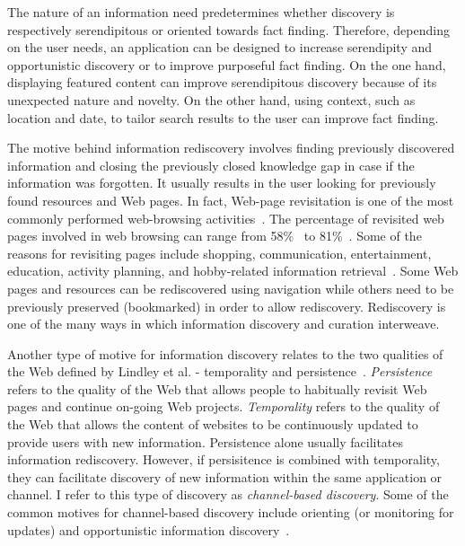 {{The nature of an information need predetermines whether discovery is respectively serendipitous or oriented towards fact finding. Therefore, depending on the user needs, an application can be designed to increase serendipity and opportunistic discovery or to improve purposeful fact finding. On the one hand, displaying featured content can improve serendipitous discovery because of its unexpected nature and novelty. On the other hand, using context, such as location and date, to tailor search results to the user can improve fact finding. 

The motive behind information rediscovery involves finding previously discovered information and closing the previously closed knowledge gap in case if the information was forgotten. It usually results in the user looking for previously found resources and Web pages. In fact, Web-page revisitation is one of the most commonly performed web-browsing activities~\cite{adar2008large,cockburn2003improving}. The percentage of revisited web pages involved in web browsing can range from 58\%~\cite{tauscher1997people} to 81\%~\cite{cockburn2001web}. Some of the reasons for revisiting pages include shopping, communication, entertainment, education, activity planning, and hobby-related information retrieval~\cite{adar2008large}. Some Web pages and resources can be rediscovered using navigation while others need to be previously preserved (bookmarked) in order to allow rediscovery. Rediscovery is one of the many ways in which information discovery and curation interweave. 

Another type of motive for information discovery relates to the two qualities of the Web defined by Lindley et al. - temporality and persistence~\cite{lindley2012s}. \textit{Persistence} refers to the quality of the Web that allows people to habitually revisit Web pages and continue on-going Web projects. \textit{Temporality} refers to the quality of the Web that allows the content of websites to be continuously updated to provide users with new information. Persistence alone usually facilitates information rediscovery. However, if persisitence is combined with temporality, they can facilitate discovery of new information within the same application or channel. I refer to this type of discovery as \textit{channel-based discovery}. Some of the common motives for channel-based discovery include orienting (or monitoring for updates) and opportunistic information discovery~\cite{lindley2012s}.          
}

}
